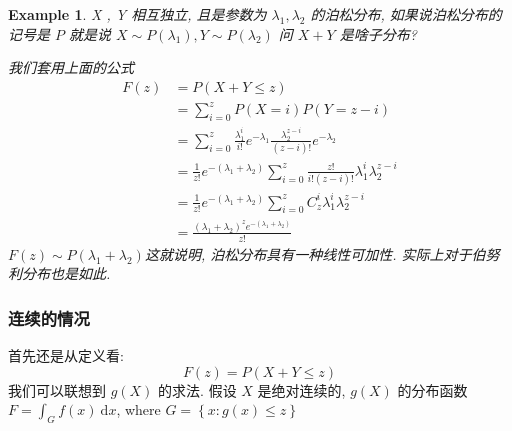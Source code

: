 \documentclass[a4paper, 10pt]{ctexart} %
\newtheorem{example}{\llap{$\rhd$ \space}Example}
\begin{document}
\begin{example}
    X , Y 相互独立, 且是参数为 $\lambda_1 , \lambda_2$ 的泊松分布, 如果说泊松分布的记号是 $P$ 就是说 $X \sim P\left(\lambda_1\right), Y \sim P \left(\lambda_2\right)$
    问 $X + Y$ 是啥子分布?

    我们套用上面的公式 
    \[
    \begin{aligned}
        F (z) & = P \left(X  + Y \le z\right) \\
        & = \sum_{i=0} ^{z}  P \left(X = i\right)  P \left(Y = z - i\right)\\
        & = \sum_{i=0} ^{z} \frac{\lambda_1 ^{i}}{i !} e ^{ - \lambda_1}\frac{ \lambda _{2}^{ z-i} }{\left(z-i\right) !} e ^{- \lambda_2}\\
        & = \frac{1}{z !}e ^{- \left(\lambda_1 + \lambda_2\right)}\sum_{i=0} ^{z} \frac{z !}{ i! \left(z -i\right) ! } \lambda ^{i}_{1} \lambda_{2}^{z -i}\\
        & = \frac{1}{z !}e ^{- \left(\lambda_1 + \lambda_2\right)}\sum_{i=0} ^{z} C_{z}^{i} \lambda _{1 }^{i}  \lambda_{2}^{z-i}\\
        & = \frac{\left(\lambda_1 + \lambda_2\right)^{z}e ^{ - \left( \lambda_1 + \lambda_2\right)}}{z ! }  
    \end{aligned}
    \]
 $F (z) \sim P ( \lambda_1 + \lambda_2)$这就说明, 泊松分布具有一种线性可加性. 实际上对于伯努利分布也是如此.
\end{example}

\subsubsection{连续的情况}
首先还是从定义看:
\[
F \left(z\right) = P\left(X + Y \le z\right)
\]
我们可以联想到 $g \left(X\right)$ 的求法. 假设 $X$ 是绝对连续的, $g\left(X\right)$ 的分布函数 $\displaystyle F = \int _{G} f \left(x \right) \ \mathrm{d}x$, where $G = \left\{ x: g\left(x\right) \le z\right\}$
\end{document}
